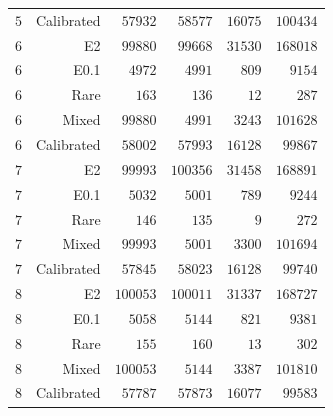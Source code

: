 \begin{longtable}{rrrrrr}
$5$ & Calibrated & $57932$ & $58577$ & $16075$ & $100434$ \\
$6$ & E2 & $99880$ & $99668$ & $31530$ & $168018$ \\
$6$ & E0.1 & $4972$ & $4991$ & $809$ & $9154$ \\
$6$ & Rare & $163$ & $136$ & $12$ & $287$ \\
$6$ & Mixed & $99880$ & $4991$ & $3243$ & $101628$ \\
$6$ & Calibrated & $58002$ & $57993$ & $16128$ & $99867$ \\
$7$ & E2 & $99993$ & $100356$ & $31458$ & $168891$ \\
$7$ & E0.1 & $5032$ & $5001$ & $789$ & $9244$ \\
$7$ & Rare & $146$ & $135$ & $9$ & $272$ \\
$7$ & Mixed & $99993$ & $5001$ & $3300$ & $101694$ \\
$7$ & Calibrated & $57845$ & $58023$ & $16128$ & $99740$ \\
$8$ & E2 & $100053$ & $100011$ & $31337$ & $168727$ \\
$8$ & E0.1 & $5058$ & $5144$ & $821$ & $9381$ \\
$8$ & Rare & $155$ & $160$ & $13$ & $302$ \\
$8$ & Mixed & $100053$ & $5144$ & $3387$ & $101810$ \\
$8$ & Calibrated & $57787$ & $57873$ & $16077$ & $99583$ \\
\end{longtable}
\endgroup
